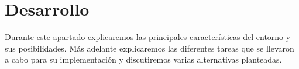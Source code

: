 \chapter{Desarrollo}
\label{section:Desarrollo}
Durante este apartado explicaremos las principales características del entorno y sus posibilidades. Más adelante explicaremos las diferentes tareas que se llevaron a cabo para su implementación y discutiremos varias alternativas planteadas.





